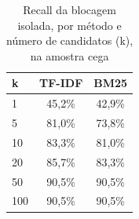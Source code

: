 \begin{table}[htbp]
\centering
\caption{Recall da blocagem isolada, por método e número de candidatos (k), na amostra cega}
\label{tab:recall-blocagem}
\small
\begin{tabular}{lcc}
\toprule
\textbf{k} & \textbf{TF-IDF} & \textbf{BM25} \\
\midrule
1 & 45,2\% & 42,9\% \\
5 & 81,0\% & 73,8\% \\
10 & 83,3\% & 81,0\% \\
20 & 85,7\% & 83,3\% \\
50 & 90,5\% & 90,5\% \\
100 & 90,5\% & 90,5\% \\
\bottomrule
\end{tabular}
\vspace{2mm}
\end{table}
